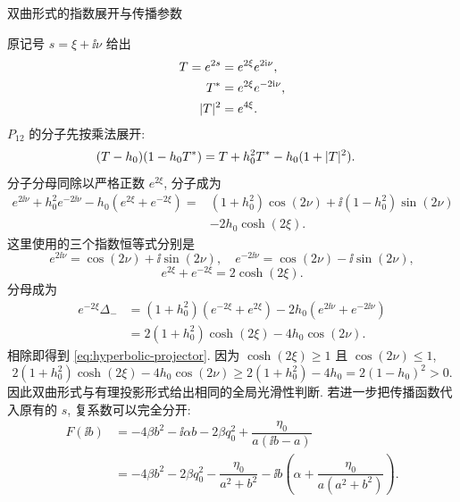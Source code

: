 \par\medskip\noindent 双曲形式的指数展开与传播参数\par
原记号 $s=\xi+\ii\nu$ 给出
\begin{equation*}
\begin{aligned}
T=e^{2s}&=e^{2\xi}e^{2\mathrm{i}\nu},\\
{T}^{*}&=e^{2\xi}e^{-2\mathrm{i}\nu},\\
|T|^2&=e^{4\xi}.
\end{aligned}
\end{equation*}
$P_{12}$ 的分子先按乘法展开:
\begin{equation*}
\begin{aligned}
(T-h_0)(1-h_0{T}^{*})
&=T+h_0^2{T}^{*}-h_0(1+|T|^2).
\end{aligned}
\end{equation*}
分子分母同除以严格正数 $e^{2\xi}$, 分子成为
\begin{equation*}
\begin{aligned}
e^{2\ii\nu}+h_0^2e^{-2\ii\nu}
-h_0(e^{2\xi}+e^{-2\xi})
={}&(1+h_0^2)\cos(2\nu)
+\ii(1-h_0^2)\sin(2\nu)\\
&-2h_0\cosh(2\xi).
\end{aligned}
\end{equation*}
这里使用的三个指数恒等式分别是
\begin{equation*}
e^{2\ii\nu}=\cos(2\nu)+\ii\sin(2\nu),\quad
e^{-2\ii\nu}=\cos(2\nu)-\ii\sin(2\nu),
\end{equation*}
\begin{equation*}
e^{2\xi}+e^{-2\xi}=2\cosh(2\xi).
\end{equation*}
分母成为
\begin{equation*}
\begin{aligned}
e^{-2\xi}\Delta_-
&=(1+h_0^2)(e^{-2\xi}+e^{2\xi})
-2h_0(e^{2\ii\nu}+e^{-2\ii\nu})\\
&=2(1+h_0^2)\cosh(2\xi)-4h_0\cos(2\nu).
\end{aligned}
\end{equation*}
相除即得到 \eqref{eq:hyperbolic-projector}.
因为 $\cosh(2\xi)\ge1$ 且 $\cos(2\nu)\le1$,
\begin{equation*}
2(1+h_0^2)\cosh(2\xi)-4h_0\cos(2\nu)
\ge2(1+h_0^2)-4h_0=2(1-h_0)^2>0.
\end{equation*}
因此双曲形式与有理投影形式给出相同的全局光滑性判断.
若进一步把传播函数代入原有的 $s$, 复系数可以完全分开:
\begin{equation*}
\begin{aligned}
F(\ii b)
&=-4\beta b^2-\ii\alpha b-2\beta q_0^2
+\dfrac{\eta_0}{a(\ii b-a)}\\
&=-4\beta b^2-2\beta q_0^2-\dfrac{\eta_0}{a^2+b^2}
-\ii b\left(\alpha+\dfrac{\eta_0}{a(a^2+b^2)}\right).
\end{aligned}
\end{equation*}
